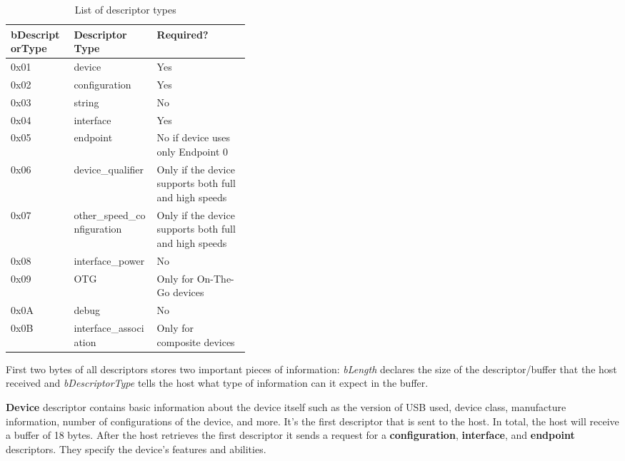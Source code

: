 \begin{table}[ht]
    \centering
    \begin{tabular}{|l|l|p{0.39\linewidth}|} \hline
         \textbf{bDescriptorType} & \textbf{Descriptor Type} & \textbf{Required?} \\ \hline
         0x01 & device                      & Yes \\ \hline
         0x02 & configuration               & Yes \\ \hline
         0x03 & string                      & No  \\ \hline
         0x04 & interface                   & Yes \\ \hline
         0x05 & endpoint                    & No if device uses only Endpoint 0 \\ \hline
         0x06 & device\_qualifier           & Only if the device supports both full and high speeds \\ \hline
         0x07 & other\_speed\_configuration & Only if the device supports both full and high speeds \\ \hline
         0x08 & interface\_power            & No \\ \hline
         0x09 & OTG                         & Only for On-The-Go devices \\ \hline
         0x0A & debug                       & No \\ \hline
         0x0B & interface\_association      & Only for composite devices \\ \hline
         \end{tabular}
    \caption{List of descriptor types}
    \label{tab:descriptor_types}
\end{table}

First two bytes of all descriptors stores two important pieces of information: \emph{bLength} declares the size of the descriptor/buffer that the host received and \emph{bDescriptorType} tells the host what type of information can it expect in the buffer.

\textbf{Device} descriptor contains basic information about the device itself such as the version of USB used, device class, manufacture information, number of configurations of the device, and more. It's the first descriptor that is sent to the host. In total, the host will receive a buffer of 18 bytes. After the host retrieves the first descriptor it sends a request for a \textbf{configuration}, \textbf{interface}, and \textbf{endpoint} descriptors. They specify the device's features and abilities. 


